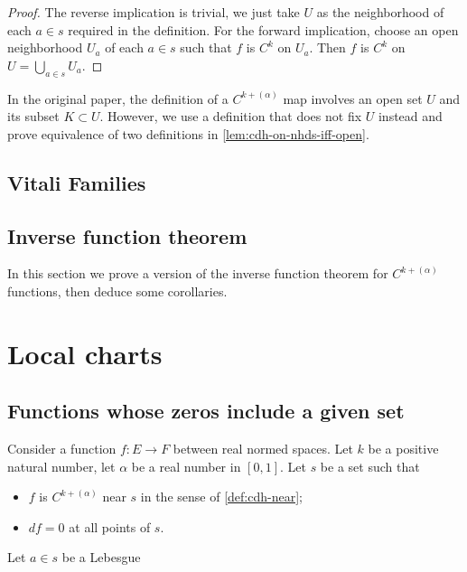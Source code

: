 \begin{proof}
  The reverse implication is trivial, we just take \(U\) as the neighborhood of each \(a \in s\) required in the definition.
  For the forward implication, choose an open neighborhood \(U_{a}\) of each \(a \in s\) such that \(f\) is \(C^{k}\) on \(U_{a}\).
  Then \(f\) is \(C^{k}\) on \(U = \bigcup_{a \in s} U_{a}\).
\end{proof}

\begin{remark}
  In the original paper, the definition of a \(C^{k+(\alpha)}\) map
  involves an open set \(U\) and its subset \(K\subset U\).
  However, we use a definition that does not fix \(U\) instead
  and prove equivalence of two definitions in \autoref{lem:cdh-on-nhds-iff-open}.
\end{remark}

\section{Vitali Families}%
\label{sec:vitali-families}

\section{Inverse function theorem}%
\label{sec:inverse-funct-theor}


In this section we prove a version of the inverse function theorem for \(C^{k+(\alpha)}\) functions,
then deduce some corollaries.
\chapter{Local charts}%
\label{cha:local-charts}

\section{Functions whose zeros include a given set}

\begin{lemma}%
  \label{lem:chart-one-deriv-zero}
  Consider a function \(f\colon E\to F\) between real normed spaces.
  Let \(k\) be a positive natural number, let \(\alpha\) be a real number in \([0, 1]\).
  Let \(s\) be a set such that
  \begin{itemize}
  \item \(f\) is \(C^{k+(\alpha)}\) near \(s\) in the sense of \autoref{def:cdh-near};
  \item \(df = 0\) at all points of \(s\).
  \end{itemize}
  Let \(a \in s\) be a Lebesgue 
\end{lemma}


